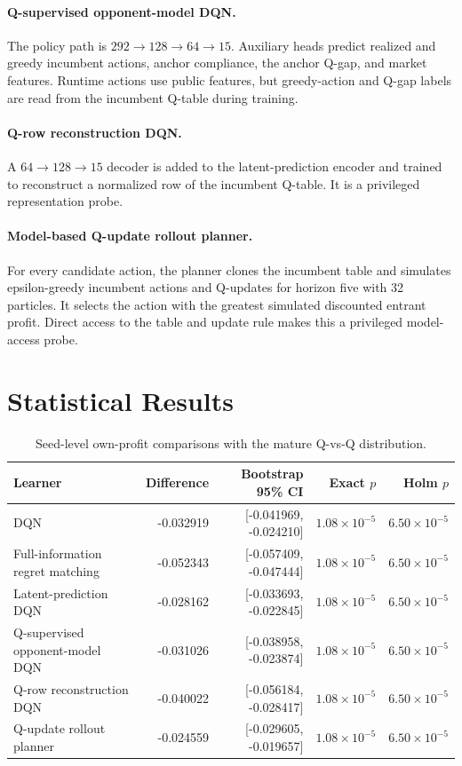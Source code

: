 \documentclass[11pt]{article}
\begin{document}
\paragraph{Q-supervised opponent-model DQN.}
The policy path is \(292\to128\to64\to15\). Auxiliary heads predict realized
and greedy incumbent actions, anchor compliance, the anchor Q-gap, and market
features. Runtime actions use public features, but greedy-action and Q-gap
labels are read from the incumbent Q-table during training.

\paragraph{Q-row reconstruction DQN.}
A \(64\to128\to15\) decoder is added to the latent-prediction encoder and trained to
reconstruct a normalized row of the incumbent Q-table. It is a privileged
representation probe.

\paragraph{Model-based Q-update rollout planner.}
For every candidate action, the planner clones the incumbent table and
simulates epsilon-greedy incumbent actions and Q-updates for horizon five with
32 particles. It selects the action with the greatest simulated discounted
entrant profit.
Direct access to the table and update rule makes this a privileged
model-access probe.

\section{Statistical Results}
\label{app:statistics}

\begin{table}[H]
\centering
\caption{Seed-level own-profit comparisons with the mature Q-vs-Q
distribution.}
\scriptsize
\begin{tabular}{lrrrr}
\toprule
Learner & Difference & Bootstrap 95\% CI & Exact \(p\) & Holm \(p\) \\
\midrule
DQN & -0.032919 & [-0.041969, -0.024210] & \(1.08{\times}10^{-5}\) & \(6.50{\times}10^{-5}\) \\
Full-information regret matching & -0.052343 & [-0.057409, -0.047444] & \(1.08{\times}10^{-5}\) & \(6.50{\times}10^{-5}\) \\
Latent-prediction DQN & -0.028162 & [-0.033693, -0.022845] & \(1.08{\times}10^{-5}\) & \(6.50{\times}10^{-5}\) \\
Q-supervised opponent-model DQN & -0.031026 & [-0.038958, -0.023874] & \(1.08{\times}10^{-5}\) & \(6.50{\times}10^{-5}\) \\
Q-row reconstruction DQN & -0.040022 & [-0.056184, -0.028417] & \(1.08{\times}10^{-5}\) & \(6.50{\times}10^{-5}\) \\
Q-update rollout planner & -0.024559 & [-0.029605, -0.019657] & \(1.08{\times}10^{-5}\) & \(6.50{\times}10^{-5}\) \\
\bottomrule
\end{tabular}
\end{table}
\end{document}
